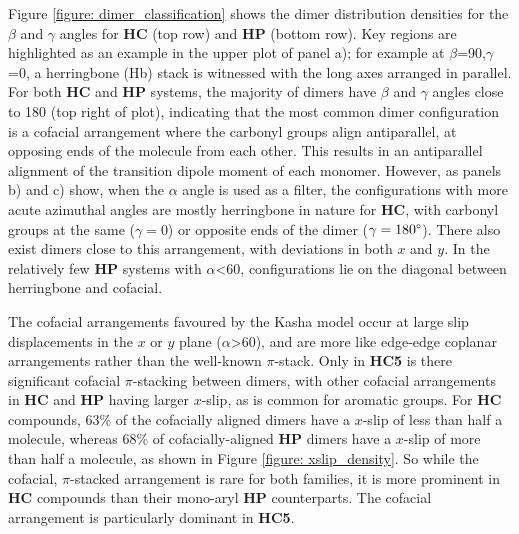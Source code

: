 Figure \ref{figure: dimer_classification} shows the dimer distribution densities for the $\beta$ and $\gamma$ angles for \textbf{HC} (top row) and \textbf{HP} (bottom row). Key regions are highlighted as an example in the upper plot of panel a); for example at $\beta$=90,$\gamma$=0, a herringbone (Hb) stack is witnessed with the long axes arranged in parallel. For both \textbf{HC} and \textbf{HP} systems, the majority of dimers have $\beta$ and $\gamma$ angles close to 180\degree{} (top right of plot), indicating that the most common dimer configuration is a cofacial arrangement where the carbonyl groups align antiparallel, at opposing ends of the molecule from each other. This results in an antiparallel alignment of the \sone{} transition dipole moment of each monomer.  However, as panels b) and c) show, when the $\alpha$ angle is used as a filter, the configurations with more acute azimuthal angles are mostly herringbone in nature for \textbf{HC}, with carbonyl groups at the same ($\gamma=$0\degree) or opposite ends of the dimer ($\gamma=180\degree$). There also exist dimers close to this arrangement, with deviations in both $x$ and $y$. In the relatively few \textbf{HP} systems with  $\alpha$\textless{60}\degree{}, configurations lie on the diagonal between herringbone and cofacial.

The cofacial arrangements favoured by the Kasha model occur at large slip displacements in the $x$ or $y$  plane ($\alpha$\textgreater{60}), and are more like edge-edge coplanar arrangements rather than the well-known $\pi$-stack. Only in \textbf{HC5} is there significant cofacial $\pi$-stacking between dimers, with other cofacial arrangements in \textbf{HC} and \textbf{HP} having larger $x$-slip, as is common for aromatic groups. For \textbf{HC} compounds, 63\% of the cofacially aligned dimers have a $x$-slip of less than half a molecule, whereas 68\% of cofacially-aligned \textbf{HP} dimers have a $x$-slip of more than half a molecule, as shown in Figure \ref{figure: xslip_density}. So while the cofacial, $\pi$-stacked arrangement is rare for both families, it is more prominent in \textbf{HC} compounds than their mono-aryl \textbf{HP} counterparts. The cofacial arrangement is particularly dominant in \textbf{HC5}.


